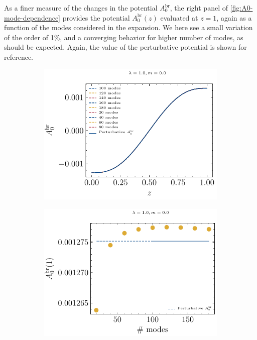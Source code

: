 As a finer measure of the changes in the potential $A_0^\text{br}$, the right panel of \ref{fig:A0-mode-dependence} provides the potential $A_0^\text{br}(z)$ evaluated at $z=1$, again as a function of the modes considered in the expansion. We here see a small variation of the order of 1\%, and a converging behavior for higher number of modes, as should be expected. Again, the value of the perturbative potential is shown for reference.
\begin{figure}
\begin{subfigure}{0.5\textwidth}
    \includegraphics[width=\linewidth]{figures/dirichlet/A0InducedComparison.pdf}
\end{subfigure}
\begin{subfigure}{0.5\textwidth}
    \includegraphics[width=\linewidth]{figures/dirichlet/A0(1) mode comparison.pdf}

\end{subfigure}
\end{figure}
